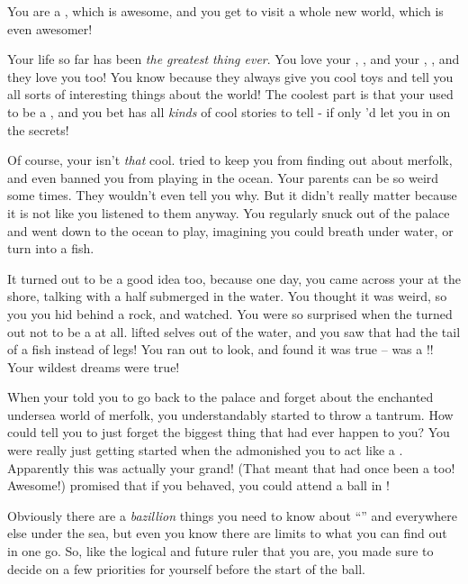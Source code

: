 \documentclass[char]{NeptuneBall}
\begin{document}
\name{\cWillow{}}

You are a \cWillow{\prince}, which is awesome, and you get to visit a whole new world, which is even awesomer!

Your life so far has been \emph{the greatest thing ever}. You love your \cAriel{\pa}, \cAriel{}, and your \cEric{\pa}, \cEric{}, and they love you too! You know because they always give you cool toys and tell you all sorts of interesting things about the world! The coolest part is that your \cAriel{\pa} used to be a \emph{\cAriel{\mer}}, and you bet \cAriel{\they} has all \emph{kinds} of cool stories to tell - if only \cAriel{\they}'d let you in on the secrets!

Of course, your \cAriel{\pa} isn't \emph{that} cool. \cAriel{\They} tried to keep you from finding out about merfolk, and even banned you from playing in the ocean. Your parents can be so weird some times. They wouldn't even tell you why. But it didn't really matter because it is not like you listened to them anyway. You regularly snuck out of the palace and went down to the ocean to play, imagining you could breath under water, or turn into a fish.

It turned out to be a good idea too, because one day, you came across your \cAriel{\pa} at the shore, talking with a \cKing{\human} half submerged in the water. You thought it was weird, so you you hid behind a rock, and watched. You were so surprised when the \cKing{\human} turned out not to be a \cKing{\human} at all. \cKing{\They} lifted \cKing{\them}selves out of the water, and you saw that \cKing{\they} had the tail of a fish instead of legs! You ran out to look, and found it was true -- \cKing{\they} was a \cKing{\mer}!! Your wildest dreams were true! 

When your \cAriel{\pa} told you to go back to the palace and forget about the enchanted undersea world of merfolk, you understandably started to throw a tantrum. How could \cAriel{\they} tell you to just forget the biggest thing that had ever happen to you? You were really just getting started when the \cKing{\mer} admonished you to act like a \cWillow{\prince}. Apparently this \cKing{\mer} was actually your grand\cKing{\parent}! (That meant that \cAriel{\pa} had once been a \cAriel{\mer} too! Awesome!) \cKing{\They} promised that if you behaved, you could attend a ball in \pAtlantis{}!

Obviously there are a \emph{bazillion} things you need to know about ``\pAtlantis{}'' and everywhere else under the sea, but even you know there are limits to what you can find out in one go. So, like the logical \cWillow{\prince} and future ruler that you are, you made sure to decide on a few priorities for yourself before the start of the ball.
\end{document}
